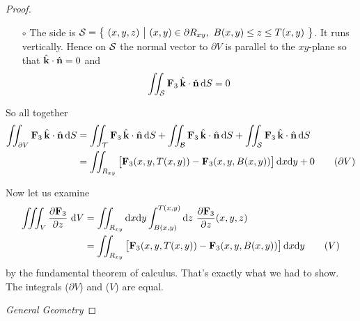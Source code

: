 \begin{proof}
\begin{itemize}
\item[$\circ$]
The side is $\cS=\Set{(x,y,z)}{(x,y)\in\partial R_{xy},\ B(x,y)\le z\le T(x,y)}$. It runs vertically. Hence on  $\mathcal{S}$ the normal vector to $\partial V$ 
is parallel to the $xy$-plane so that $\hat{\mathbf{k}}\cdot\hat{\mathbf{n}}=0$ and
\begin{equation*}
\iint_{\mathcal{S}}  \mathbf{F}_3\,\hat{\mathbf{k}} \cdot\hat{\mathbf{n}}\,\mathrm{d}S = 0
\end{equation*}
\end{itemize}

So all together
\begin{align}
\iint_{\partial V}  \mathbf{F}_3\,\hat{\mathbf{k}} \cdot\hat{\mathbf{n}}\,\mathrm{d}S
&=\iint_{\mathcal{T}}  \mathbf{F}_3\,\hat{\mathbf{k}} \cdot\hat{\mathbf{n}}\,\mathrm{d}S
 +\iint_{\mathcal{B}}  \mathbf{F}_3\,\hat{\mathbf{k}} \cdot\hat{\mathbf{n}}\,\mathrm{d}S
 +\iint_{\mathcal{S}}  \mathbf{F}_3\,\hat{\mathbf{k}} \cdot\hat{\mathbf{n}}\,\mathrm{d}S \notag\\
&=\iint_{R_{xy}}  \big[\mathbf{F}_3(x,y,T(x,y))
   -\mathbf{F}_3(x,y,B(x,y))\big]\,\mathrm{d}x\mathrm{d}y
   +0
\tag{$\partial V$}
\end{align}

Now let us examine
\begin{align}
\tripInt_V\frac{\partial \vF_3}{\partial z}\ \dee{V} 
&= \dblInt_{R_{xy}}\dee{x}\dee{y}\int_{B(x,y)}^{T(x,y)}\dee{z}\ 
            \frac{\partial \vF_3}{\partial z}(x,y,z) \notag\\
&=\dblInt_{R_{xy}}  \big[\vF_3(x,y,T(x,y))
   -\vF_3(x,y,B(x,y))\big]\,\dee{x}\dee{y}
\tag{$V$}
\end{align}
by the fundamental theorem of calculus.
That's exactly what we had to show. The integrals ($\partial V$)
and ($V$) are equal.


\medskip
\noindent \emph{General Geometry}


\end{proof}
